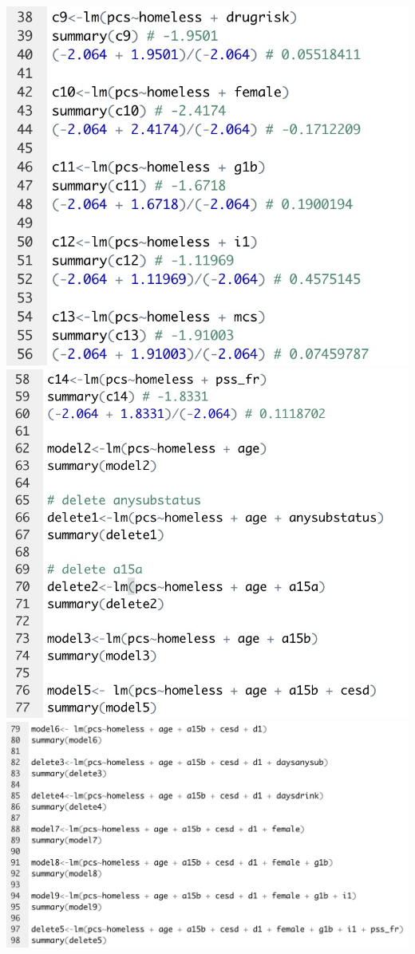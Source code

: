 \documentclass{report}
\begin{document}
\includegraphics[scale=0.3]{c.jpeg}\\
\includegraphics[scale=0.3]{d.jpeg}\\
\includegraphics[scale=0.3]{e.jpeg}\\
\end{document}
